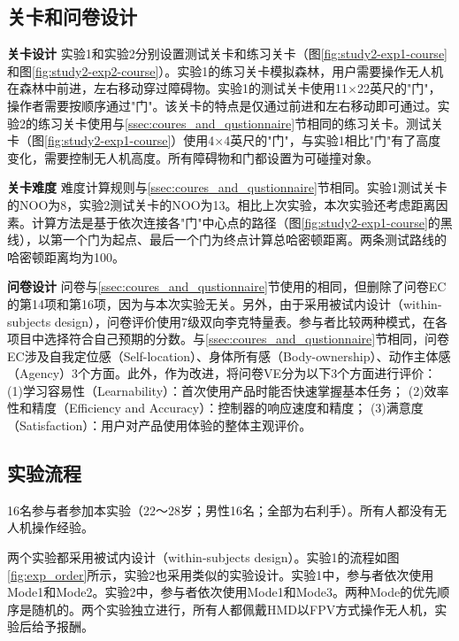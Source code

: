 \subsection{关卡和问卷设计}

\textbf{关卡设计}\quad
实验1和实验2分别设置测试关卡和练习关卡（图\ref{fig:study2-exp1-course}和图\ref{fig:study2-exp2-course}）。实验1的练习关卡模拟森林，用户需要操作无人机在森林中前进，左右移动穿过障碍物。实验1的测试关卡使用11$\times$22英尺的"门"，操作者需要按顺序通过"门"。该关卡的特点是仅通过前进和左右移动即可通过。实验2的练习关卡使用与\ref{ssec:coures_and_qustionnaire}节相同的练习关卡。测试关卡（图\ref{fig:study2-exp1-course}）使用4$\times$4英尺的"门"，与实验1相比"门"有了高度变化，需要控制无人机高度。所有障碍物和门都设置为可碰撞对象。

\textbf{关卡难度}\quad
难度计算规则与\ref{ssec:coures_and_qustionnaire}节相同。实验1测试关卡的NOO为8，实验2测试关卡的NOO为13。相比上次实验，本次实验还考虑距离因素。计算方法是基于依次连接各"门"中心点的路径（图\ref{fig:study2-exp1-course}的黑线），以第一个门为起点、最后一个门为终点计算总哈密顿距离。两条测试路线的哈密顿距离均为100。



\textbf{问卷设计}\quad
问卷与\ref{ssec:coures_and_qustionnaire}节使用的相同，但删除了问卷EC的第14项和第16项，因为与本次实验无关。另外，由于采用被试内设计（within-subjects design），问卷评价使用7级双向李克特量表。参与者比较两种模式，在各项目中选择符合自己预期的分数。与\ref{ssec:coures_and_qustionnaire}节相同，问卷EC涉及自我定位感（Self-location）、身体所有感（Body-ownership）、动作主体感（Agency）3个方面。此外，作为改进，将问卷VE分为以下3个方面进行评价\cites{sibarani2021usability}：
(1)学习容易性（Learnability）：首次使用产品时能否快速掌握基本任务；
(2)效率性和精度（Efficiency and Accuracy）：控制器的响应速度和精度；
(3)满意度（Satisfaction）：用户对产品使用体验的整体主观评价。

\subsection{实验流程}

16名参与者参加本实验（22～28岁；男性16名；全部为右利手）。所有人都没有无人机操作经验。

两个实验都采用被试内设计（within-subjects design）。实验1的流程如图\ref{fig:exp_order}所示，实验2也采用类似的实验设计。实验1中，参与者依次使用Mode1和Mode2。实验2中，参与者依次使用Mode1和Mode3。两种Mode的优先顺序是随机的。两个实验独立进行，所有人都佩戴HMD以FPV方式操作无人机，实验后给予报酬。

